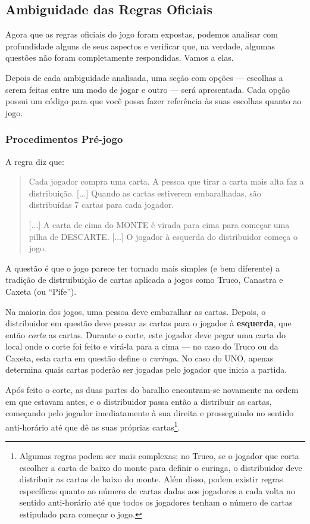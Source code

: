 \subsection{Ambiguidade das Regras Oficiais}

Agora que as regras oficiais do jogo foram expostas, podemos analisar com profundidade alguns de seus aspectos e verificar que, na verdade, algumas questões não foram completamente respondidas. Vamos a elas.

Depois de cada ambiguidade analisada, uma seção com opções --- escolhas a serem feitas entre um modo de jogar e outro --- será apresentada. Cada opção possui um código para que você possa fazer referência às suas escolhas quanto ao jogo.

\subsubsection{Procedimentos Pré-jogo}

A regra diz que:

\begin{quotation}
Cada jogador compra uma carta. A pessoa que tirar a carta mais alta faz a distribuição. [...] Quando as cartas estiverem embaralhadas, são distribuídas 7 cartas para cada jogador.

[...] A carta de cima do MONTE é virada para cima para começar uma pilha de DESCARTE. [...] O jogador à esquerda do distribuidor começa o jogo.
\end{quotation}

A questão é que o jogo parece ter tornado mais simples (e bem diferente) a tradição de distruibuição de cartas aplicada a jogos como Truco, Canastra e Caxeta (ou ``Pife'').

Na maioria dos jogos, uma pessoa deve embaralhar as cartas. Depois, o distribuidor em questão deve passar as cartas para o jogador à \textbf{esquerda}, que então \textit{corta} as cartas. Durante o corte, este jogador deve pegar uma carta do local onde o corte foi feito e virá-la para a cima --- no caso do Truco ou da Caxeta, esta carta em questão define o \textit{curinga}. No caso do UNO, apenas determina quais cartas poderão ser jogadas pelo jogador que inicia a partida.

Após feito o corte, as duas partes do baralho encontram-se novamente na ordem em que estavam antes, e o distribuidor passa então a distribuir as cartas, começando pelo jogador imediatamente à sua direita e prosseguindo no sentido anti-horário até que dê as suas próprias cartas\footnote{Algumas regras podem ser mais complexas; no Truco, se o jogador que corta escolher a carta de baixo do monte para definir o curinga, o distribuidor deve distribuir as cartas de baixo do monte. Além disso, podem existir regras específicas quanto ao número de cartas dadas aos jogadores a cada volta no sentido anti-horário até que todos os jogadores tenham o número de cartas estipulado para começar o jogo.}.

